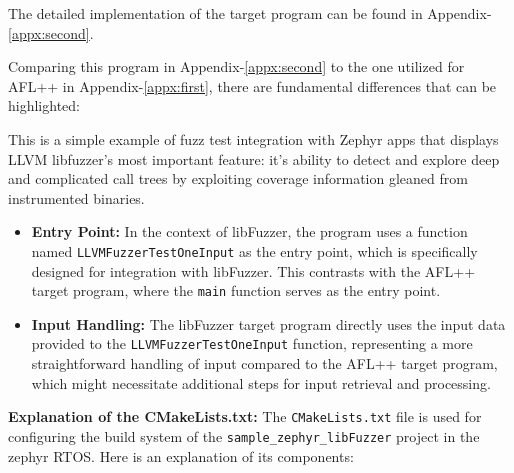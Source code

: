 The detailed implementation of the target program can be
found in Appendix-\ref{appx:second}.

Comparing this program in Appendix-\ref{appx:second} to the one utilized for
AFL++ in Appendix-\ref{appx:first}, there are fundamental differences that
can be highlighted:

This is a simple example of fuzz test integration with Zephyr apps
that displays LLVM libfuzzer's most important feature: it's ability to
detect and explore deep and complicated call trees by exploiting
coverage information gleaned from instrumented binaries.

\begin{itemize}
    \item \textbf{Entry Point:} In the context of libFuzzer, the program uses a function
    named \texttt{LLVMFuzzerTestOneInput} as the entry point,
    which is specifically designed for integration with libFuzzer.
    This contrasts with the AFL++ target program, where the
    \texttt{main} function serves as the entry point.
    \item \textbf{Input Handling:} The libFuzzer target program directly uses
    the input data provided to the \texttt{LLVMFuzzerTestOneInput} function,
    representing a more straightforward handling of input compared to the
    AFL++ target program, which might necessitate additional steps for input
    retrieval and processing.
\end{itemize}

\textbf{Explanation of the CMakeLists.txt:}
The \texttt{CMakeLists.txt} file is used for configuring the build system
of the \texttt{sample\_zephyr\_libFuzzer} project in the zephyr RTOS.
Here is an explanation of its components:

